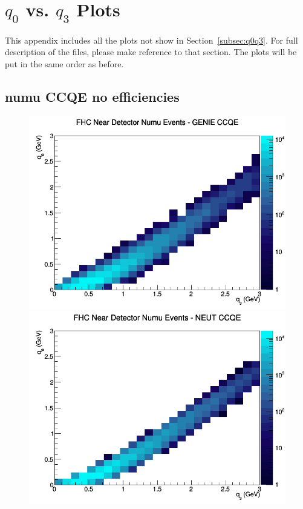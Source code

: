 \section{$q_0$ vs. $q_3$ Plots}
\label{app:q0q3_app}
This appendix includes all the plots not show in Section~\ref{subsec:q0q3}. For full description of the files, please make reference to that section. The plots will be put in the same order as before.
\subsection{numu CCQE no efficiencies}
\begin{figure}[h]
\includegraphics[width=\linewidth]{q0_q3/nominal/CCQE_FHC_ND_numu_q3_q0_GENIE.png}
\endminipage
{}
\includegraphics[width=\linewidth]{q0_q3/nominal/CCQE_FHC_ND_numu_q3_q0_NEUT.png}

\end{figure}

